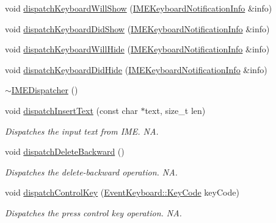 \begin{DoxyCompactItemize}
void \hyperlink{classIMEDispatcher_a51d272229b8a061bdf38ee460c2fba03}{dispatch\+Keyboard\+Will\+Show} (\hyperlink{structIMEKeyboardNotificationInfo}{I\+M\+E\+Keyboard\+Notification\+Info} \&info)
\item 
void \hyperlink{classIMEDispatcher_af5fab401ef02cb038de32f2b8f525284}{dispatch\+Keyboard\+Did\+Show} (\hyperlink{structIMEKeyboardNotificationInfo}{I\+M\+E\+Keyboard\+Notification\+Info} \&info)
\item 
void \hyperlink{classIMEDispatcher_aec4b9bee27550e70c9b78e7b2ed5f138}{dispatch\+Keyboard\+Will\+Hide} (\hyperlink{structIMEKeyboardNotificationInfo}{I\+M\+E\+Keyboard\+Notification\+Info} \&info)
\item 
void \hyperlink{classIMEDispatcher_a60699adf2ac55bcb25d1b7782299ec6e}{dispatch\+Keyboard\+Did\+Hide} (\hyperlink{structIMEKeyboardNotificationInfo}{I\+M\+E\+Keyboard\+Notification\+Info} \&info)
\item 
\hyperlink{classIMEDispatcher_a1324cb0b92e74c3c83a2b684732abe91}{$\sim$\+I\+M\+E\+Dispatcher} ()
\item 
\mbox{\label{classIMEDispatcher_a4600ab7b1ae11d351f0bd2cb411b02a5}} 
void \hyperlink{classIMEDispatcher_a4600ab7b1ae11d351f0bd2cb411b02a5}{dispatch\+Insert\+Text} (const char $\ast$text, size\+\_\+t len)
\begin{DoxyCompactList}\small\item\em Dispatches the input text from I\+ME.  NA. \end{DoxyCompactList}\item 
\mbox{\label{classIMEDispatcher_a77fc00411768c678ab6a09fe8890857c}} 
void \hyperlink{classIMEDispatcher_a77fc00411768c678ab6a09fe8890857c}{dispatch\+Delete\+Backward} ()
\begin{DoxyCompactList}\small\item\em Dispatches the delete-\/backward operation.  NA. \end{DoxyCompactList}\item 
\mbox{\label{classIMEDispatcher_a82a41660ae050d9d3124c83532ad26ca}} 
void \hyperlink{classIMEDispatcher_a82a41660ae050d9d3124c83532ad26ca}{dispatch\+Control\+Key} (\hyperlink{classEventKeyboard_a7cd3fa46515673276ce8ec7f0e051606}{Event\+Keyboard\+::\+Key\+Code} key\+Code)
\begin{DoxyCompactList}\small\item\em Dispatches the press control key operation.  NA. \end{DoxyCompactList}\item 

\end{DoxyCompactItemize}
